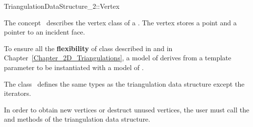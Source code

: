 

\begin{ccRefConcept}{TriangulationDataStructure_2::Vertex}


\ccDefinition
  
The concept \ccRefName\ describes the vertex class of a
.
The vertex stores a point and a pointer to an incident face.

To ensure all the \textbf{flexibility} of class 
described in 
and in Chapter~\ref{Chapter_2D_Triangulations}, a model of 
\ccRefName derives from a template parameter
 to be instantiated with a model of 
.


\ccTypes
The class \ccRefName\ defines the same types as 
the triangulation data structure 
except the iterators.


\begin{ccAdvanced}
\ccCreation

In order to obtain new vertices or destruct unused vertices, the user must
call the  and  methods of the
triangulation data structure.




\end{ccAdvanced}
\end{ccRefConcept}

